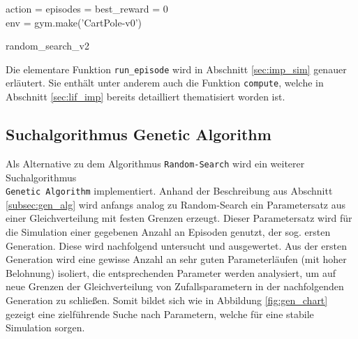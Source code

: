 		\begin{algorithm}
			
			
			action = episodes = best\_reward = 0\\
			env = gym.make('CartPole-v0')\\
			\caption{random\_search\_v2}
		\end{algorithm}
		\newpage
		Die elementare Funktion \texttt{run\_episode} wird in Abschnitt \ref{sec:imp_sim} genauer erläutert. Sie enthält unter anderem auch die Funktion \texttt{compute}, welche in Abschnitt \ref{sec:lif_imp} bereits detailliert thematisiert worden ist.
	\subsection{Suchalgorithmus Genetic Algorithm}
	\label{subsec:imp_ga}
		\enlargethispage{2\baselineskip}
		Als Alternative zu dem Algorithmus \texttt{Random-Search} wird ein weiterer Suchalgorithmus\\ \texttt{Genetic Algorithm} implementiert. Anhand der Beschreibung aus Abschnitt \ref{subsec:gen_alg} wird anfangs analog zu Random-Search ein Parametersatz aus einer Gleichverteilung mit festen Grenzen erzeugt. Dieser Parametersatz wird für die Simulation einer gegebenen Anzahl an Episoden genutzt, der sog. ersten Generation. Diese wird nachfolgend untersucht und ausgewertet. Aus der ersten Generation wird eine gewisse Anzahl an sehr guten Parameterläufen (mit hoher Belohnung) isoliert, die entsprechenden Parameter werden analysiert, um auf neue Grenzen der Gleichverteilung von Zufallsparametern in der nachfolgenden Generation zu schließen. Somit bildet sich wie in Abbildung \ref{fig:gen_chart} gezeigt eine zielführende Suche nach Parametern, welche für eine stabile Simulation sorgen.
		
